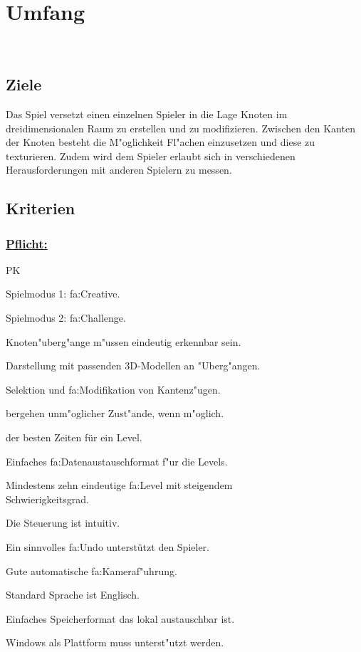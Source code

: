%
%


\chapter{Umfang}
\label{UF}~\\


%
%
\section{Ziele}
\label{UF:Ziele}

Das Spiel versetzt einen einzelnen Spieler in die Lage Knoten im dreidimensionalen Raum zu erstellen und zu modifizieren. Zwischen den Kanten der Knoten besteht die M{"o}glichkeit Fl{"a}chen einzusetzen und diese zu texturieren. Zudem wird dem Spieler erlaubt sich in verschiedenen Herausforderungen mit anderen Spielern zu messen.\\


\section{Kriterien}
% 
%
\subsection*{\underline{Pflicht:}}

\vspace{1em}

\begin{ids}{\gls{PK}}

	\id[10] Spielmodus 1: \gls{fa:Creative}.
		
	\id[20] Spielmodus 2: \gls{fa:Challenge}.
		
	\id[30] Knoten{"u}berg{"a}nge m{"u}ssen eindeutig erkennbar sein.
		
	\id[40] Darstellung mit passenden 3D-Modellen an {"U}berg{"a}ngen.
		
	\id[50] Selektion und \gls{fa:Modifikation} von Kantenz{"u}gen.
		
	bergehen unm{"o}glicher Zust{"a}nde, wenn m{"o}glich.
		
	 der besten Zeiten für ein Level.
		
	\id[80] Einfaches \gls{fa:Datenaustauschformat} f{"u}r die Levels.
		
	\id[80] Mindestens zehn eindeutige \gls{fa:Level} mit steigendem \\Schwierigkeitsgrad.
		
	\id[90] Die Steuerung ist intuitiv.
		
	\id[100] Ein sinnvolles \gls{fa:Undo} unterstützt den Spieler.
		
	\id[110] Gute automatische \gls{fa:Kamera}f{"u}hrung.
		
	\id[120] Standard Sprache ist Englisch.
		
	\id[130] Einfaches Speicherformat das lokal austauschbar ist.
		
	\id[140] Windows als Plattform muss unterst{"u}tzt werden.

\end{ids}


